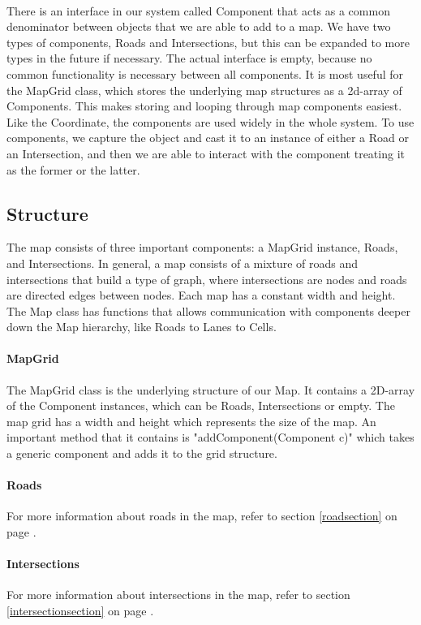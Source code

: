 \documentclass[a4paper,11pt,titlepage]{article}
\begin{document}
\paragraph{}
There is an interface in our system called Component that acts as a common denominator between objects that we are able to add to a map. We have two types of components, Roads and Intersections, but this can be expanded to more types in the future if necessary. The actual interface is empty, because no common functionality is necessary between all components. It is most useful for the MapGrid class, which stores the underlying map structures as a 2d-array of Components. This makes storing and looping through map components easiest. Like the Coordinate, the components are used widely in the whole system. To use components, we capture the object and cast it to an instance of either a Road or an Intersection, and then we are able to interact with the component treating it as the former or the latter. 
\subsection{Structure}
The map consists of three important components: a MapGrid instance, Roads, and Intersections. In general, a map consists of a mixture of roads and intersections that build a type of graph, where intersections are nodes and roads are directed edges between nodes. Each map has a constant width and height. The Map class has functions that allows communication with components deeper down the Map hierarchy, like Roads to Lanes to Cells. 
\paragraph{MapGrid}
The MapGrid class is the underlying structure of our Map. It contains a 2D-array of the Component instances, which can be Roads, Intersections or empty. The map grid has a width and height which represents the size of the map. An important method that it contains is "addComponent(Component c)" which takes a generic component and adds it to the grid structure.
\paragraph{Roads} For more information about roads in the map, refer to section \ref{roadsection} on page \pageref{roadsection}.
\paragraph{Intersections} For more information about intersections in the map, refer to section \ref{intersectionsection} on page \pageref{intersectionsection}.
\end{document}
